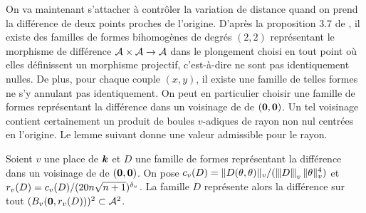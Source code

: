 \documentclass{mpg-preth}
\begin{document}
On va maintenant s'attacher à contrôler la variation de distance quand on
prend la différence de deux points proches de l'origine. D'après la
proposition 3.7 de \cite{daphimhva2}, il existe des familles de formes
bihomogènes de degrés $(2, 2)$ représentant le morphisme de différence
$\mathcal{A}\times\mathcal{A} \to \mathcal{A}$ dans le plongement choisi en tout point où elles
définissent un morphisme projectif, c'est-à-dire ne sont pas identiquement
nulles. De plus, pour chaque couple $(x, y)$, il existe une famille de telles
formes ne s'y annulant pas identiquement. On peut en particulier choisir une
famille de formes représentant la différence dans un voisinage de
 de $({\boldsymbol{0}}, {\boldsymbol{0}})$. Un tel voisinage contient certainement un
produit de boules $v$-adiques de rayon non nul centrées en l'origine. Le lemme
suivant donne une valeur admissible pour le rayon.

\begin{lem} \label{rayonRel}
  Soient $v$ une place de $\boldsymbol{k}$ et $D$ une famille de formes représentant la
  différence dans un voisinage de  de $({\boldsymbol{0}}, {\boldsymbol{0}})$. On pose
  $c_v(D) = \lVert D(\theta, \theta)\rVert_{v}/(\left\lvert\hspace{-1pt}\left\lvert\hspace{-1pt} \left\lvert D\right\rvert \hspace{-1pt}\right\rvert\hspace{-1pt}\right\rvert_{v}\lVert\theta\rVert_{v}^4)$ et $r_v(D) =
  c_v(D)/(20n\sqrt{n+1})^{\delta\smash{_v}}$. La famille $D$ représente alors la différence
  sur tout $(B_v({\boldsymbol{0}}, r_v(D)))^2 \subset \mathcal{A}^2$.
\end{lem}
\end{document}
